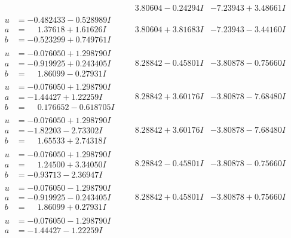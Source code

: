 \documentclass[1p]{elsarticle_modified}
\theoremstyle{definition}
\begin{document}
$$\begin{array}{c|c|c}
 & \phantom{-}3.80604 - 0.24294 I & -7.23943 + 3.48661 I \\ \hline\begin{aligned}
u &= -0.482433 - 0.528989 I \\
a &= \phantom{-}1.37618 + 1.61626 I \\
b &= -0.523299 + 0.749761 I\end{aligned}
 & \phantom{-}3.80604 + 3.81683 I & -7.23943 - 3.44160 I \\ \hline\begin{aligned}
u &= -0.076050 + 1.298790 I \\
a &= -0.919925 + 0.243405 I \\
b &= \phantom{-}1.86099 - 0.27931 I\end{aligned}
 & \phantom{-}8.28842 - 0.45801 I & -3.80878 - 0.75660 I \\ \hline\begin{aligned}
u &= -0.076050 + 1.298790 I \\
a &= -1.44427 + 1.22259 I \\
b &= \phantom{-}0.176652 - 0.618705 I\end{aligned}
 & \phantom{-}8.28842 + 3.60176 I & -3.80878 - 7.68480 I \\ \hline\begin{aligned}
u &= -0.076050 + 1.298790 I \\
a &= -1.82203 - 2.73302 I \\
b &= \phantom{-}1.65533 + 2.74318 I\end{aligned}
 & \phantom{-}8.28842 + 3.60176 I & -3.80878 - 7.68480 I \\ \hline\begin{aligned}
u &= -0.076050 + 1.298790 I \\
a &= \phantom{-}1.24500 + 3.34050 I \\
b &= -0.93713 - 2.36947 I\end{aligned}
 & \phantom{-}8.28842 - 0.45801 I & -3.80878 - 0.75660 I \\ \hline\begin{aligned}
u &= -0.076050 - 1.298790 I \\
a &= -0.919925 - 0.243405 I \\
b &= \phantom{-}1.86099 + 0.27931 I\end{aligned}
 & \phantom{-}8.28842 + 0.45801 I & -3.80878 + 0.75660 I \\ \hline\begin{aligned}
u &= -0.076050 - 1.298790 I \\
a &= -1.44427 - 1.22259 I \\

\end{aligned}
\end{array}$$
\end{document}
